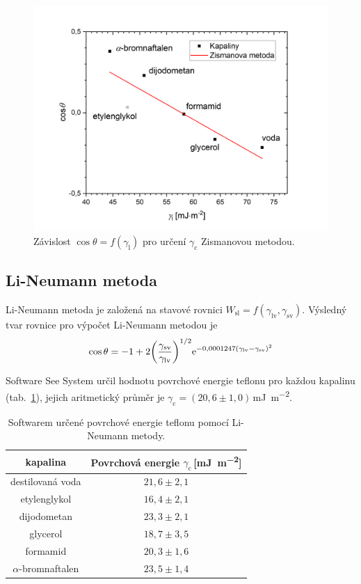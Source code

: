 \documentclass{protokol}
\begin{document}
\begin{figure}[h!]
	\centering
	\includegraphics[width=130mm]{zisman.png}
	\caption{Závislost $\cos\theta = 
		f\left(\gamma_{\text{l}} \right)$ pro určení $\gamma_{\text{c}}$ 
		Zismanovou metodou.}
	\label{graph:zisman}
\end{figure}

\subsection{Li-Neumann metoda}
\par Li-Neumann metoda je založená na stavové rovnici 
$W_\text{sl}=f(\gamma_{\text{lv}},\gamma_{\text{sv}})$. Výsledný tvar rovnice 
pro výpočet Li-Neumann metodou je
\begin{equation}
	\cos\theta = -1 + 
	2 {\left( \frac{\gamma_{\text{sv}}} {\gamma_{\text{lv}}} \right)}^{1/2} 
	\mathrm{e}^{-0,0001247(\gamma_{\text{lv}} - \gamma_{\text{sv}})^2}
\end{equation}

Software See System určil hodnotu povrchové energie teflonu pro každou 
kapalinu (tab.~\ref{table:LiNeumann}), jejich aritmetický průměr je 
$\gamma_{\text{c}} = (20,6\pm1,0)$\,\si{\milli\joule\per\meter\squared}.

\begin{table}[h]
	\caption{Softwarem určené povrchové energie teflonu pomocí Li-Neumann 
	metody.}
	\label{table:LiNeumann}
	\begin{tabular}{|c|c|}\hline
		kapalina  & Povrchová energie 
		$\gamma_{\text{c}}$\,[\si{\milli\joule\per\meter\squared}] \\ \hline
		destilovaná voda & $21,6 \pm 2,1$     \\
		etylenglykol     & $16,4 \pm 2,1$     \\
		dijodometan      & $23,3 \pm 2,1$     \\
		glycerol         & $18,7 \pm 3,5$     \\
		formamid         & $20,3 \pm 1,6$     \\
		$\alpha$-bromnaftalen & $23,5 \pm 1,4$\\ \hline
	\end{tabular}
\end{table}
\end{document}

